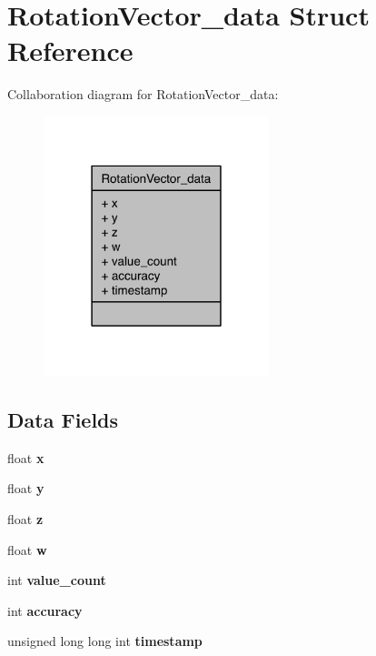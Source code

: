\section{Rotation\-Vector\-\_\-data Struct Reference}
\label{structRotationVector__data}


Collaboration diagram for Rotation\-Vector\-\_\-data\-:\nopagebreak
\begin{figure}[H]
\begin{center}
\leavevmode
\includegraphics[width=186pt]{structRotationVector__data__coll__graph}
\end{center}
\end{figure}
\subsection*{Data Fields}
\begin{DoxyCompactItemize}
\item 
float {\bfseries x}\label{structRotationVector__data_abb25a81ef51cf6654a20ad0fb0f55954}

\item 
float {\bfseries y}\label{structRotationVector__data_a93edfbb694f4b2be1ba7817da2dd9ad4}

\item 
float {\bfseries z}\label{structRotationVector__data_a7ef40176f6afe7cd85cea7c5e6da155a}

\item 
float {\bfseries w}\label{structRotationVector__data_a2db8a272a6410829daa0f7d7267de306}

\item 
int {\bfseries value\-\_\-count}\label{structRotationVector__data_a4aa8e5aa8bc5fa653e228cd4e257596c}

\item 
int {\bfseries accuracy}\label{structRotationVector__data_a63a139789ef9af56e6900d015f4d6554}

\item 
unsigned long long int {\bfseries timestamp}\label{structRotationVector__data_a352427d17ff31a07372401acdd1a5fa4}

\end{DoxyCompactItemize}



